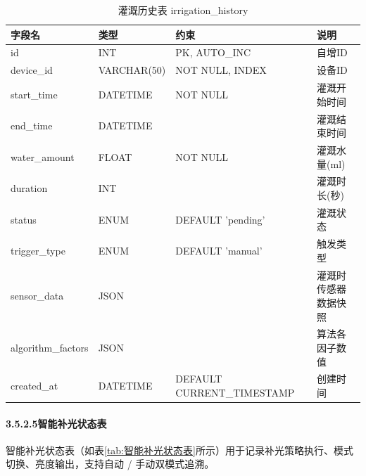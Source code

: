 \documentclass{article}
\begin{document}
\begin{table}[htbp]
  \centering
  \caption{灌溉历史表 irrigation\_history}
  \label{tab:灌溉历史表}
  \begin{tabular}{|l|l|l|l|}
    \hline
    字段名            & 类型        & 约束                        & 说明                   \\
    \hline
    id                & INT         & PK, AUTO\_INC               & 自增ID                 \\
    device\_id         & VARCHAR(50) & NOT NULL, INDEX             & 设备ID                 \\
    start\_time        & DATETIME    & NOT NULL                    & 灌溉开始时间           \\
    end\_time          & DATETIME    &                             & 灌溉结束时间           \\
    water\_amount      & FLOAT       & NOT NULL                    & 灌溉水量(ml)           \\
    duration          & INT         &                             & 灌溉时长(秒)           \\
    status            & ENUM        & DEFAULT 'pending'           & 灌溉状态               \\
    trigger\_type      & ENUM        & DEFAULT 'manual'            & 触发类型               \\
    sensor\_data       & JSON        &                             & 灌溉时传感器数据快照   \\
    algorithm\_factors & JSON        &                             & 算法各因子数值         \\
    created\_at        & DATETIME    & DEFAULT CURRENT\_TIMESTAMP  & 创建时间               \\
    \hline
  \end{tabular}
\end{table}


\paragraph{3.5.2.5智能补光状态表}

智能补光状态表（如表\ref{tab:智能补光状态表}所示）用于记录补光策略执行、模式切换、亮度输出，支持自动 / 手动双模式追溯。
\end{document}
